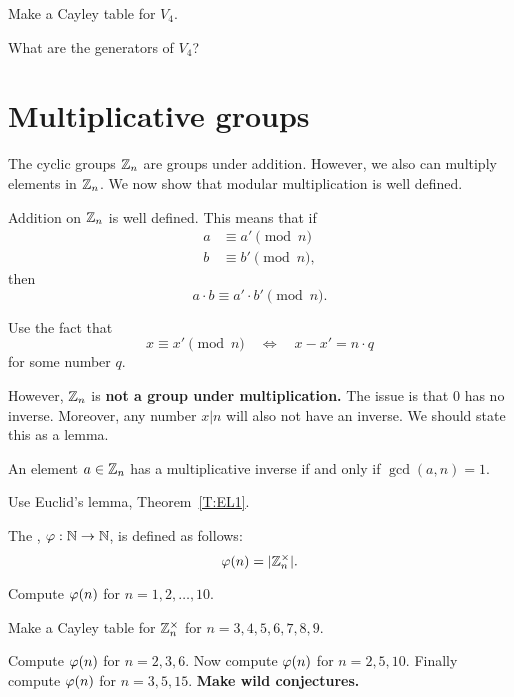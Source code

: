 \documentclass{ximera}
\begin{document}
\begin{exercise}
  Make a Cayley table for $V_4$.
\end{exercise}

\begin{exercise}
  What are the generators of $V_4$?
\end{exercise}


\section{Multiplicative groups}


The cyclic groups $\mathbb Z_n$ are groups under addition. However, we also
can multiply elements in $\mathbb Z_n$. We now show that modular
multiplication is well defined.

\begin{lemma}
  Addition on $\mathbb Z_n$ is well defined. This means that if
  \begin{align*}
    a &\equiv a' \pmod{n}\\
    b &\equiv b' \pmod{n},
  \end{align*}
  then
  \[
  a\cdot b \equiv a'\cdot b' \pmod{n}.
  \]
  \begin{sketch}
    Use the fact that
    \[
    x \equiv x'\pmod{n} \quad \Leftrightarrow \quad x -x' = n\cdot q
    \]
    for some number $q$.
  \end{sketch}
\end{lemma}

However, $\mathbb Z_n$ is \textbf{not a group under multiplication.} The
issue is that $0$ has no inverse. Moreover, any number $x|n$ will also
not have an inverse. We should state this as a lemma.

\begin{lemma}
  An element $a\in\mathbb Z_n$ has a multiplicative inverse if and only if
  $\gcd(a,n) = 1$.
  \begin{sketch}
    Use Euclid's lemma, Theorem~\ref{T:EL1}.
  \end{sketch}
\end{lemma}

\begin{definition}
  The , $\eulerphi:\N\to\N$, is defined as
  follows:
  \[
  \eulerphi(n) = |\Z_n^\times|.
  \]
\end{definition}

\begin{exercise}
  Compute $\eulerphi(n)$ for $n = 1,2,\dots, 10$.
\end{exercise}


\begin{exercise}
  Make a Cayley table for $\mathbb Z_n^\times$ for $n = 3,4,5,6,7,8,9$.
\end{exercise}


\begin{exercise}
  Compute $\eulerphi(n)$ for $n = 2,3,6$. Now compute $\eulerphi(n)$
  for $n = 2,5,10$. Finally compute $\eulerphi(n)$ for $n=
  3,5,15$. \textbf{Make wild conjectures.}
\end{exercise}
\end{document}
